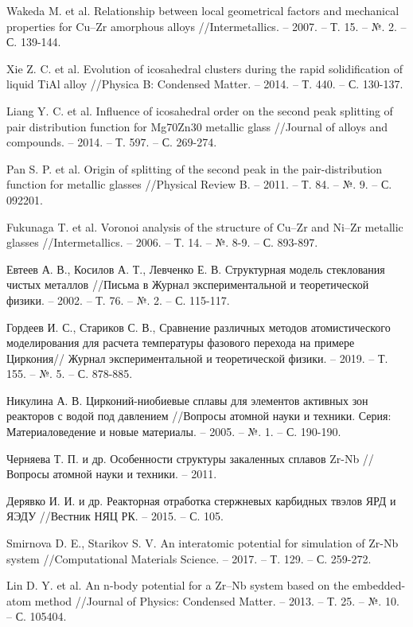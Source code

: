 \documentclass[master,14pt,subf,href,colorlinks=true]{disser}
\begin{document}
\begin{thebibliography}{44}
	Wakeda M. et al. Relationship between local geometrical factors and mechanical properties for Cu–Zr amorphous alloys //Intermetallics. – 2007. – Т. 15. – №. 2. – С. 139-144.
	
	Xie Z. C. et al. Evolution of icosahedral clusters during the rapid solidification of liquid TiAl alloy //Physica B: Condensed Matter. – 2014. – Т. 440. – С. 130-137.
	
	Liang Y. C. et al. Influence of icosahedral order on the second peak splitting of pair distribution function for Mg70Zn30 metallic glass //Journal of alloys and compounds. – 2014. – Т. 597. – С. 269-274.
	
	Pan S. P. et al. Origin of splitting of the second peak in the pair-distribution function for metallic glasses //Physical Review B. – 2011. – Т. 84. – №. 9. – С. 092201.
	
	Fukunaga T. et al. Voronoi analysis of the structure of Cu–Zr and Ni–Zr metallic glasses //Intermetallics. – 2006. – Т. 14. – №. 8-9. – С. 893-897.
	
	Евтеев А. В., Косилов А. Т., Левченко Е. В. Структурная модель стеклования чистых металлов //Письма в Журнал экспериментальной и теоретической физики. – 2002. – Т. 76. – №. 2. – С. 115-117.
	
	Гордеев И. С., Стариков С. В., Сравнение различных методов атомистического моделирования для расчета температуры фазового перехода на примере Циркония// Журнал экспериментальной и теоретической физики. – 2019. – Т. 155. – №. 5. – С. 878-885.
	
	Никулина А. В. Цирконий-ниобиевые сплавы для элементов активных зон реакторов с водой под давлением //Вопросы атомной науки и техники. Серия: Материаловедение и новые материалы. – 2005. – №. 1. – С. 190-190.
	
	Черняева Т. П. и др. Особенности структуры закаленных сплавов Zr-Nb //Вопросы атомной науки и техники. – 2011.
	
	Дерявко И. И. и др. Реакторная отработка стержневых карбидных твэлов ЯРД и ЯЭДУ //Вестник НЯЦ РК. – 2015. – С. 105.
	
	Smirnova D. E., Starikov S. V. An interatomic potential for simulation of Zr-Nb system //Computational Materials Science. – 2017. – Т. 129. – С. 259-272.
	
	Lin D. Y. et al. An n-body potential for a Zr–Nb system based on the embedded-atom method //Journal of Physics: Condensed Matter. – 2013. – Т. 25. – №. 10. – С. 105404.
	

\end{thebibliography}
\end{document}
